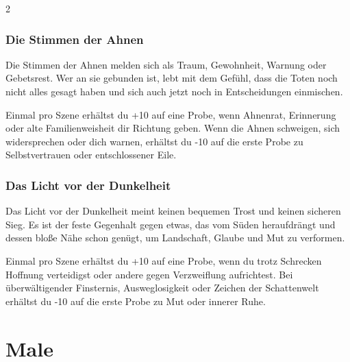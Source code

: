 {\begin{multicols*}{2}
        \subsubsection*{Die Stimmen der Ahnen}
        Die Stimmen der Ahnen melden sich als Traum, Gewohnheit, Warnung oder Gebetsrest. Wer an sie gebunden ist, lebt mit dem Gefühl, dass die Toten noch nicht alles gesagt haben und sich auch jetzt noch in Entscheidungen einmischen.

        \bindungspielwertebox
        {Einmal pro Szene erhältst du +10 auf eine Probe, wenn Ahnenrat, Erinnerung oder alte Familienweisheit dir Richtung geben.}
        {Wenn die Ahnen schweigen, sich widersprechen oder dich warnen, erhältst du -10 auf die erste Probe zu Selbstvertrauen oder entschlossener Eile.}

        \subsubsection*{Das Licht vor der Dunkelheit}
        Das Licht vor der Dunkelheit meint keinen bequemen Trost und keinen sicheren Sieg. Es ist der feste Gegenhalt gegen etwas, das vom Süden heraufdrängt und dessen bloße Nähe schon genügt, um Landschaft, Glaube und Mut zu verformen.

        \bindungspielwertebox
        {Einmal pro Szene erhältst du +10 auf eine Probe, wenn du trotz Schrecken Hoffnung verteidigst oder andere gegen Verzweiflung aufrichtest.}
        {Bei überwältigender Finsternis, Ausweglosigkeit oder Zeichen der Schattenwelt erhältst du -10 auf die erste Probe zu Mut oder innerer Ruhe.}

    \end{multicols*}
}


\section{Male}\label{sec:male}

